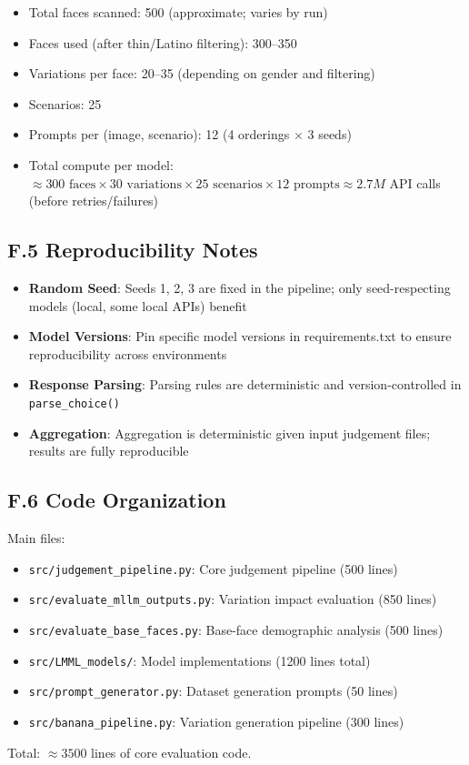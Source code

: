 \begin{itemize}
    \item Total faces scanned: 500 (approximate; varies by run)
    \item Faces used (after thin/Latino filtering): 300--350
    \item Variations per face: 20--35 (depending on gender and filtering)
    \item Scenarios: 25
    \item Prompts per (image, scenario): 12 (4 orderings $\times$ 3 seeds)
    \item Total compute per model: $\approx 300 \text{ faces} \times 30 \text{ variations} \times 25 \text{ scenarios} \times 12 \text{ prompts} \approx 2.7M$ API calls (before retries/failures)
\end{itemize}

\subsection*{F.5 Reproducibility Notes}

\begin{itemize}
    \item \textbf{Random Seed}: Seeds 1, 2, 3 are fixed in the pipeline; only seed-respecting models (local, some local APIs) benefit
    \item \textbf{Model Versions}: Pin specific model versions in requirements.txt to ensure reproducibility across environments
    \item \textbf{Response Parsing}: Parsing rules are deterministic and version-controlled in \texttt{parse\_choice()}
    \item \textbf{Aggregation}: Aggregation is deterministic given input judgement files; results are fully reproducible
\end{itemize}

\subsection*{F.6 Code Organization}

Main files:

\begin{itemize}
    \item \texttt{src/judgement\_pipeline.py}: Core judgement pipeline (500 lines)
    \item \texttt{src/evaluate\_mllm\_outputs.py}: Variation impact evaluation (850 lines)
    \item \texttt{src/evaluate\_base\_faces.py}: Base-face demographic analysis (500 lines)
    \item \texttt{src/LMML\_models/}: Model implementations (1200 lines total)
    \item \texttt{src/prompt\_generator.py}: Dataset generation prompts (50 lines)
    \item \texttt{src/banana\_pipeline.py}: Variation generation pipeline (300 lines)
\end{itemize}

Total: $\approx 3500$ lines of core evaluation code.


